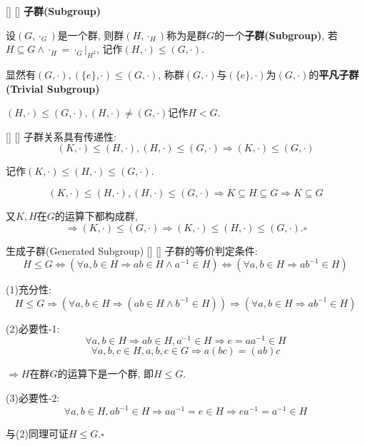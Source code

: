 \documentclass[UTF8]{ctexart}
\begin{document}
		\begin{dfn}
            []
            {}
            []
            []
			\textbf{子群(Subgroup)}

			设$(G,\cdot_G)$是一个群, 则群$(H,\cdot_H)$称为是群$G$的一个\textbf{子群(Subgroup)}, 若$H\subseteq G\wedge\cdot_H=\cdot_G|_{H^2}$, 记作$(H,\cdot)\leq (G,\cdot)$. 
			
			显然有$(G,\cdot),(\{e\},\cdot)\leq(G,\cdot)$, 称群$(G,\cdot)$与$(\{e\},\cdot)$为$(G,\cdot)$的\textbf{平凡子群(Trivial Subgroup)}
			
			$(H,\cdot)\leq (G,\cdot), (H,\cdot)\neq (G,\cdot)$记作$H<G$. 
		\end{dfn}
		
		\begin{ppt}
            []
            {}
            []
            []
			子群关系具有传递性: 
			\[(K,\cdot)\leq (H,\cdot), (H,\cdot)\leq (G,\cdot)\Longrightarrow (K,\cdot)\leq (G,\cdot)\]
			
			记作$(K,\cdot)\leq (H,\cdot)\leq (G,\cdot)$. 
		\end{ppt}
		\begin{prf}
			\[(K,\cdot)\leq (H,\cdot), (H,\cdot)\leq (G,\cdot)\Longrightarrow K\subseteq H\subseteq G\Longrightarrow K\subseteq G\]
			
			又$K,H$在$G$的运算下都构成群, 
			\[\Longrightarrow (K,\cdot)\leq (G,\cdot)\Longrightarrow (K,\cdot)\leq (H,\cdot)\leq (G,\cdot). \square\]
		\end{prf}
  
		\begin{ppt}
            []
            {生成子群(Generated Subgroup)}
            []
            []
			子群的等价判定条件: 
			\[H\leq G\iff(\forall a,b\in H\Longrightarrow ab\in H\wedge a^{-1}\in H)\iff(\forall a,b\in H\Longrightarrow ab^{-1}\in H)\]
		\end{ppt}
  
		\begin{prf}
			
			(1)充分性: 
			\[H\leq G\Longrightarrow(\forall a,b\in H\Longrightarrow(ab\in H\wedge b^{-1}\in H))\Longrightarrow(\forall a,b\in H\Longrightarrow ab^{-1}\in H)\]
			
			(2)必要性-1: 
			\[\forall a,b\in H\Longrightarrow ab\in H, a^{-1}\in H\Longrightarrow e=aa^{-1}\in H\]
			\[\forall a,b,c\in H, a,b,c\in G\Longrightarrow a(bc)=(ab)c\]
			
			$\Longrightarrow H$在群$G$的运算下是一个群, 即$H\leq G$. 
			
			(3)必要性-2: 
			\[\forall a,b\in H, ab^{-1}\in H\Longrightarrow aa^{-1}=e\in H\Longrightarrow ea^{-1}=a^{-1}\in H\]
			
			与(2)同理可证$H\leq G. \square$
		\end{prf}
  
\end{document}
